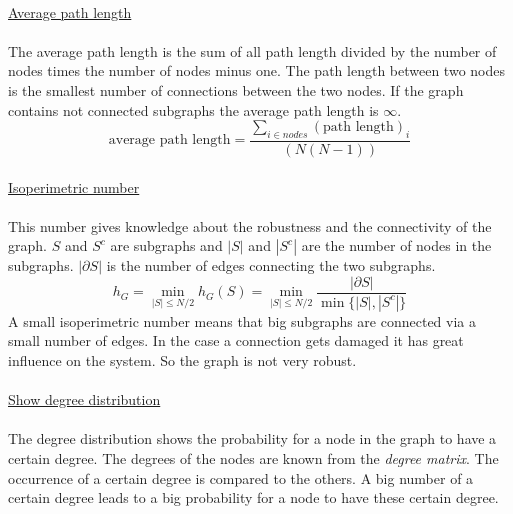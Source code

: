 \documentclass[12pt]{report}
\begin{document}
\\
\underline{Average path length}\\
\\
The average path length is the sum of all path length divided by the number of nodes times the number of nodes minus one. The path length between two nodes is the smallest number of connections between the two nodes. If the graph contains not connected subgraphs the average path length is $ \infty $.
\begin{equation}
\mbox{average path length} = \frac{\sum_{i\in nodes}(\mbox{path length})_i}{(N(N-1))}
\label{EQ:gleichung9}
\end{equation}
\\
\underline{Isoperimetric number}\\
\\
This number gives knowledge about the robustness and the connectivity of the graph. $S$ and $S^c$ are subgraphs and $|S|$ and $|S^c|$ are the number of nodes in the subgraphs. $|\partial S|$ is the number of edges connecting the two subgraphs.\\
\begin{equation}
h_{G} = \min_{|S|\leq{N/2}} h_{G}(S) = \min_{|S|\leq{N/2}} \frac{|\partial S|}{\min{\{|S|,|S^c|\}}} 
\label{EQ:gleichung10}
\end{equation}
A small isoperimetric number means that big subgraphs are connected via a small number of edges. In the case a connection gets damaged it has great influence on the system. So the graph is not very robust.\\
\\
\underline{Show degree distribution}\\
\\
The degree distribution shows the probability for a node in the graph to have a certain degree. The degrees of the nodes are known from the \textit{degree matrix}. The occurrence of a certain degree is compared to the others. A big number of a certain degree leads to a big probability for a node to have these certain degree.\\
\\
\end{document}
